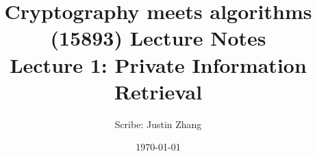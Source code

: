 \documentclass[11pt]{article}
\title{{\Large Cryptography meets algorithms (15893) Lecture Notes}\\[5pt]
{\bf Lecture 1: Private Information Retrieval}}
\author{Scribe: Justin Zhang}
\date{\today}
\begin{document}
\maketitle


{

}
{

}



\end{document}
